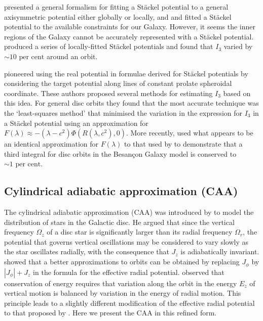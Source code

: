 \documentclass[useAMS,usenatbib,fleqn,a4paper]{mn2e}
\def\percent{\text{ per cent}}
\def\percent{\text{ per cent}}
\begin{document}
\cite{DejonghedeZeeuw1988} presented a general formalism for fitting a
St\"ackel potential to a general axisymmetric potential either globally or
locally, and \cite{BatsleerDejonghe} and \cite{Famaey2003} fitted a St\"ackel
potential to the available constraints for our Galaxy.  However, it seems the
inner regions of the Galaxy cannot be accurately represented with a St\"ackel
potential.  \cite{deBruyne2000} produced a series of locally-fitted St\"ackel
potentials and found that $I_3$ varied by $\sim10\percent$ around an orbit.

\cite{KentdeZeeuw1991} pioneered using the real potential in formulae
derived for St\"ackel potentials by considering the target potential along lines of constant prolate spheroidal coordinate. These authors proposed several methods for estimating $I_3$ based on this idea. For general disc orbits they found that the most accurate technique
was the `least-squares method' that minimised the variation in the expression
for $I_3$ in a St\"ackel potential using an approximation for
$F(\lambda)\approx-(\lambda-c^2)\Phi(R(\lambda,c^2),0)$.  More recently,
\cite{Bienayme2015} used what appears to be an identical approximation for
$F(\lambda)$ to that used by \cite{KentdeZeeuw1991} to demonstrate that a
third integral for disc orbits in the Besan\c con Galaxy model is conserved to
$\sim 1\percent$.

\subsection{Cylindrical adiabatic approximation (CAA)}\label{Method::PAA}

The cylindrical adiabatic approximation (CAA) was introduced by
\cite{Binney2010} to model the distribution of stars in the Galactic disc. He
argued that since the vertical frequency $\Omega_z$ of a disc star is
significantly larger than its radial frequency $\Omega_r$, the potential that
governs vertical oscillations may be considered to vary slowly as the star
oscillates radially, with the consequence that $J_z$ is adiabatically
invariant.  \citet{BinneyMcMillan2011} showed that a better approximations to
orbits can be obtained by replacing $J_\phi$ by $|J_\phi|+J_z$ in the formula
for the effective radial potential.  \citet{Schonrich2012} observed that
conservation of energy requires that variation along the orbit in the energy
$E_z$ of vertical motion is balanced by variation in the energy of radial
motion. This principle leads to a slightly different modification of the
effective radial potential to that proposed by \citet{BinneyMcMillan2011}.
Here we present the CAA in this refined form.
\end{document}
